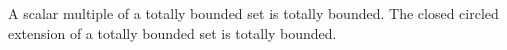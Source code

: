 A scalar multiple of a totally bounded set is totally bounded. The closed circled extension of a totally bounded set is totally bounded.
